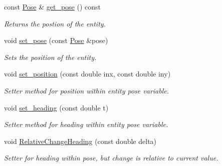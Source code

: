 \begin{DoxyCompactItemize}
\mbox{\label{class_arena_entity_a9a0efa995da3ed55e92f54357fd2bdae}} 
const \mbox{\hyperlink{struct_pose}{Pose}} \& \mbox{\hyperlink{class_arena_entity_a9a0efa995da3ed55e92f54357fd2bdae}{get\+\_\+pose}} () const
\begin{DoxyCompactList}\small\item\em Returns the postion of the entity. \end{DoxyCompactList}\item 
\mbox{\label{class_arena_entity_a6eb76e5f1b5949314c12cc512d6930ae}} 
void \mbox{\hyperlink{class_arena_entity_a6eb76e5f1b5949314c12cc512d6930ae}{set\+\_\+pose}} (const \mbox{\hyperlink{struct_pose}{Pose}} \&pose)
\begin{DoxyCompactList}\small\item\em Sets the position of the entity. \end{DoxyCompactList}\item 
\mbox{\label{class_arena_entity_a3136704edf07c24639319abf5c28dac0}} 
void \mbox{\hyperlink{class_arena_entity_a3136704edf07c24639319abf5c28dac0}{set\+\_\+position}} (const double inx, const double iny)
\begin{DoxyCompactList}\small\item\em Setter method for position within entity pose variable. \end{DoxyCompactList}\item 
\mbox{\label{class_arena_entity_ac1cc3c6997bc7a9573128fc5ded9eb72}} 
void \mbox{\hyperlink{class_arena_entity_ac1cc3c6997bc7a9573128fc5ded9eb72}{set\+\_\+heading}} (const double t)
\begin{DoxyCompactList}\small\item\em Setter method for heading within entity pose variable. \end{DoxyCompactList}\item 
void \mbox{\hyperlink{class_arena_entity_a4c4bd7f5ffb778979303c33cb3bc9986}{Relative\+Change\+Heading}} (const double delta)
\begin{DoxyCompactList}\small\item\em Setter for heading within pose, but change is relative to current value. \end{DoxyCompactList}\item 
\mbox{\label{class_arena_entity_a5790a5d45229aa76223a8183ac916323}} 

\end{DoxyCompactItemize}
